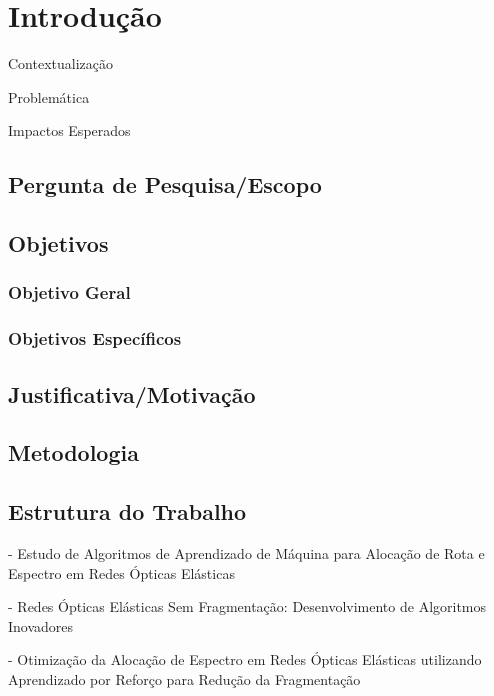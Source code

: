 \chapter[Introdução]{Introdução}

Contextualização

Problemática

Impactos Esperados

\section{Pergunta de Pesquisa/Escopo}

\section{Objetivos}

\subsection{Objetivo Geral}

\subsection{Objetivos Específicos}

\section{Justificativa/Motivação}

\section{Metodologia}

\section{Estrutura do Trabalho}

- Estudo de Algoritmos de Aprendizado de Máquina para Alocação de Rota e Espectro em Redes Ópticas Elásticas

- Redes Ópticas Elásticas Sem Fragmentação: Desenvolvimento de Algoritmos Inovadores

- Otimização da Alocação de Espectro em Redes Ópticas Elásticas utilizando Aprendizado por Reforço para Redução da Fragmentação
